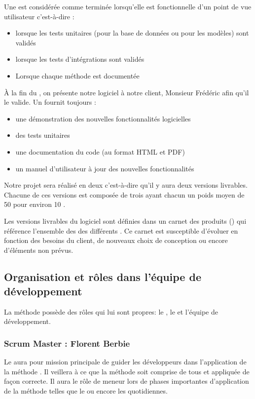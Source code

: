 Une   est considérée comme terminée lorsqu'elle est fonctionnelle d’un point de vue utilisateur c'est-à-dire :
\begin{itemize}
	\item lorsque les tests unitaires (pour la base de données ou pour les modèles) sont validés
	\item lorsque les tests d’intégrations sont validés
	\item Lorsque chaque méthode est documentée
\end{itemize}

À la fin du , on présente notre logiciel à notre client, Monsieur Frédéric  afin qu'il le valide. 
Un  fournit toujours :
\begin{itemize}
	\item une démonstration des nouvelles fonctionnalités logicielles
	\item des tests unitaires
	\item une documentation du code (au format HTML et PDF)
	\item un manuel d’utilisateur à jour des nouvelles fonctionnalités
\end{itemize}

Notre projet sera réalisé en deux  c'est-à-dire qu'il y aura deux versions livrables. Chacune de ces versions est composée de trois 
  ayant chacun un poids moyen de 50 pour environ 10 .

Les versions livrables du logiciel sont définies dans un carnet des produits () qui référence l'ensemble des  des
différents . Ce carnet est susceptible d’évoluer en fonction des besoins du client, de nouveaux choix de conception ou encore d’éléments non prévus. 

\subsection{Organisation et rôles dans l'équipe de développement}
La méthode  possède des rôles qui lui sont propres: le , le  et l'équipe de développement. 

\subsubsection{Scrum Master : Florent Berbie}
Le  aura pour mission principale de guider les développeurs dans l'application de la méthode . Il veillera à ce que la méthode soit
comprise de tous et appliquée de façon correcte. Il aura le rôle de meneur lors de phases importantes d’application de la méthode telles que le
 ou encore les  quotidiennes.
